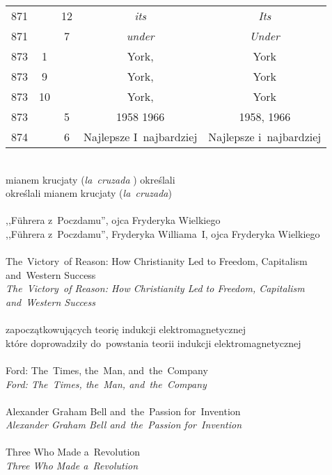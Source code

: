 \documentclass[a4paper,11pt]{article}
\begin{document}
\begin{center}
\begin{tabular}{|c|c|c|c|c|}
    871 & & 12 & \emph{its} & \emph{Its} \\
    871 & &  7 & \emph{under} & \emph{Under} \\
    873 &  1 & & York, & York \\
    873 &  9 & & York, & York \\
    873 & 10 & & York, & York \\
    873 & &  5 & 1958 1966 & 1958, 1966 \\
    874 & &  6 & Najlepsze I~najbardziej & Najlepsze i~najbardziej \\
    \hline
  \end{tabular}
\end{center}
\noi
{} \\
\Jest mianem krucjaty (\emph{la~cruzada} ) określali \\
\Pow  określali mianem krucjaty (\emph{la~cruzada}) \\
 \\
\Jest ,,F\"{u}hrera z~Poczdamu'', ojca Fryderyka Wielkiego \\
\Pow ,,F\"{u}hrera z~Poczdamu'', Fryderyka Williama~I, ojca Fryderyka
Wielkiego \\
 \\
\Jest The~Victory~of Reason: How Christianity Led to Freedom,
Capitalism and~Western Success \\
\Pow \emph{The~Victory~of Reason: How Christianity Led to Freedom,
  Capitalism and~Western Success} \\
 \\
\Jest zapoczątkowujących teorię indukcji elektromagnetycznej \\
\Pow  które doprowadziły do~powstania teorii indukcji elektromagnetycznej \\
 \\
\Jest Ford: The~Times, the~Man, and~the~Company \\
\Pow  \emph{Ford: The~Times, the~Man, and~the~Company} \\
 \\
\Jest Alexander Graham Bell and~the~Passion for~Invention \\
\Pow  \emph{Alexander Graham Bell and~the~Passion for~Invention} \\
 \\
\Jest Three Who Made a~Revolution \\
\Pow  \emph{Three Who Made a~Revolution} \\
 \\
\end{document}
